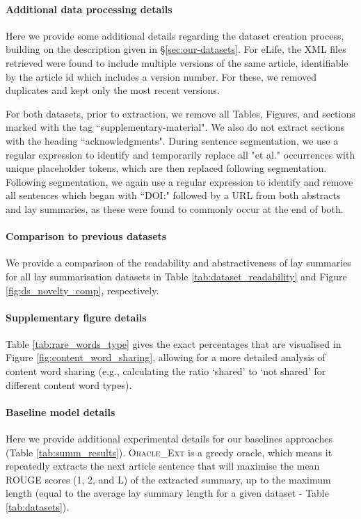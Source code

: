 \documentclass[11pt]{article}
\begin{document}
\paragraph{Additional data processing details}
Here we provide some additional details regarding the dataset creation process, building on the description given in \S\ref{sec:our-datasets}. 
For eLife, the XML files retrieved were found to include multiple versions of the same article, identifiable by the article id which includes a version number. For these, we removed duplicates and kept only the most recent versions. 

For both datasets, prior to extraction, we remove all Tables, Figures, and sections marked with the tag ``supplementary-material". We also do not extract sections with the heading ``acknowledgments". 
During sentence segmentation, we use a regular expression to identify and temporarily replace all "et al." occurrences with unique placeholder tokens, which are then replaced following segmentation. 
Following segmentation, we again use a regular expression to identify and remove all sentences which began with ``DOI:" followed by a URL from both abstracts and lay summaries, as these were found to commonly occur at the end of both.

\paragraph{Comparison to previous datasets} 
We provide a comparison of the readability and abstractiveness of lay summaries for all lay summarisation datasets in Table \ref{tab:dataset_readability} and Figure \ref{fig:ds_novelty_comp}, respectively.

\paragraph{Supplementary figure details}
Table \ref{tab:rare_words_type} gives the exact percentages that are visualised in Figure \ref{fig:content_word_sharing}, allowing for a more detailed analysis of content word sharing (e.g., calculating the ratio `shared' to `not shared' for different content word types).

\paragraph{Baseline model details}
Here we provide additional experimental details for our baselines approaches (Table \ref{tab:summ_results}). 
\textsc{Oracle\_Ext} is a greedy oracle, which means it repeatedly extracts the next article sentence that will maximise the mean ROUGE scores (1, 2, and L) of the extracted summary, up to the maximum length (equal to the average lay summary length for a given dataset - Table \ref{tab:datasets}).
\end{document}
